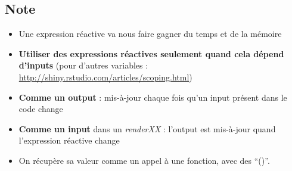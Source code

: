 \documentclass[
]{article}
\newenvironment{Shaded}{\begin{snugshade}}{\end{snugshade}}
\newcommand{\AttributeTok}[1]{\textcolor[rgb]{0.13,0.29,0.53}{#1}}
\newcommand{\ConstantTok}[1]{\textcolor[rgb]{0.56,0.35,0.01}{#1}}
\newcommand{\DecValTok}[1]{\textcolor[rgb]{0.00,0.00,0.81}{#1}}
\newcommand{\FunctionTok}[1]{\textcolor[rgb]{0.13,0.29,0.53}{\textbf{#1}}}
\newcommand{\NormalTok}[1]{#1}
\newcommand{\OtherTok}[1]{\textcolor[rgb]{0.56,0.35,0.01}{#1}}
\newcommand{\SpecialCharTok}[1]{\textcolor[rgb]{0.81,0.36,0.00}{\textbf{#1}}}
\newcommand{\StringTok}[1]{\textcolor[rgb]{0.31,0.60,0.02}{#1}}
\begin{document}
\begin{Shaded}
\end{Shaded}

\hypertarget{note}{%
\subsection{Note}\label{note}}

\begin{itemize}
\item
  Une expression réactive va nous faire gagner du temps et de la mémoire
\item
  \textbf{Utiliser des expressions réactives seulement quand cela dépend
  d'inputs} (pour d'autres variables :
  \url{http://shiny.rstudio.com/articles/scoping.html})
\item
  \textbf{Comme un output} : mis-à-jour chaque fois qu'un input présent
  dans le code change
\item
  \textbf{Comme un input} dans un \emph{renderXX} : l'output est
  mis-à-jour quand l'expression réactive change
\item
  On récupère sa valeur comme un appel à une fonction, avec des ``()''.
\end{itemize}
\end{document}
